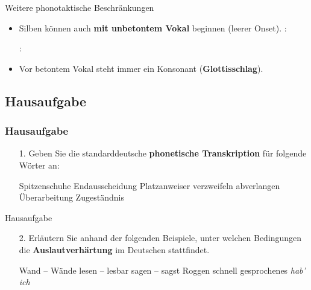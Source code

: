 \begin{frame}{Weitere phonotaktische Beschränkungen}
	
\begin{itemize}	
	\item Silben können auch \textbf{mit unbetontem Vokal} beginnen (\ras leerer Onset).
	\ea {}: 
	\z
	
	\ea {}:  
	\z

\pause 
	
	\item Vor betontem Vokal steht immer ein Konsonant (\textbf{Glottisschlag}).
	
	\ea
	\z

\end{itemize}

\end{frame}


\subsection{Hausaufgabe}

\begin{frame}
\frametitle{Hausaufgabe}

\begin{itemize}
	\item[1.]{Geben Sie die standarddeutsche \textbf{phonetische Transkription} für folgende Wörter an:}
	
	\eal \label{ex:03bHA1}
	\ex Spitzenschuhe
	\ex Endausscheidung
	\ex Platzanweiser
	\ex verzweifeln
	\ex abverlangen
	\ex Überarbeitung
	\ex Zugeständnis
	\zl
\end{itemize}

\end{frame}

\begin{frame}{Hausaufgabe}

\begin{itemize}
\item[2.]{Erläutern Sie anhand der folgenden Beispiele, unter welchen Bedingungen die \textbf{Auslautverhärtung} im Deutschen stattfindet.}

\eal \label{ex:03bHA2}
\ex Wand -- Wände
\ex lesen -- lesbar
\ex sagen -- sagst
\ex Roggen
\ex schnell gesprochenes \textit{hab' ich}
\zl

\end{itemize}

\end{frame}

